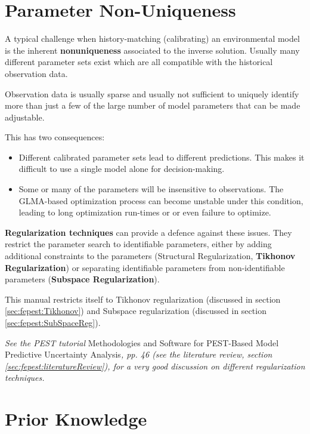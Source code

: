 \section{Parameter Non-Uniqueness}

A typical challenge when history-matching (calibrating) an environmental model is the inherent \textbf{nonuniqueness} associated to the inverse solution. Usually many different parameter sets exist which are all compatible with the historical observation data.

Observation data is usually sparse and usually not sufficient to uniquely identify more than just a few of the large number of model parameters that can be made adjustable.

This has two consequences:

\begin{itemize}
\item Different calibrated parameter sets lead to different predictions. This makes it difficult to use a single model alone for decision-making. 
\item Some or many of the parameters will be insensitive to observations. The GLMA-based optimization process can become unstable under this condition, leading to long optimization run-times or or even failure to optimize.
\end{itemize}

\textbf{Regularization techniques} can provide a defence against these issues. They restrict the parameter search to identifiable parameters, either by adding additional constraints to the parameters (Structural Regularization, \textbf{Tikhonov Regularization}) or separating identifiable parameters from non-identifiable parameters (\textbf{Subspace Regularization}).

This manual restricts itself to Tikhonov regularization (discussed in section \ref{sec:fepest:Tikhonov}) and Subspace regularization (discussed in section \ref{sec:fepest:SubSpaceReg}). 

\textit{See the PEST tutorial} Methodologies and Software for PEST-Based Model Predictive Uncertainty Analysis\textit{, pp. 46 (see the literature review, section \ref{sec:fepest:literatureReview}), for a very good discussion on different regularization techniques.}

\section{Prior Knowledge}
\label{sec:fepest:priorKnowledge}


